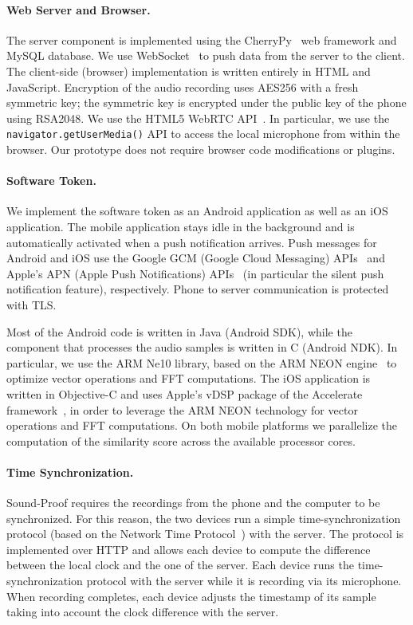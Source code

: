 \paragraph{Web Server and Browser.}
The server component is implemented using the CherryPy~\cite{cherrypy} web framework and MySQL database.
We use WebSocket~\cite{websocketsrfc} to push data from the server to the client.
The client-side (browser) implementation is written entirely in HTML and JavaScript.
Encryption of the audio recording uses AES256 with a fresh symmetric key; the symmetric key is encrypted under the public key of the phone using RSA2048.
We use the HTML5 WebRTC API~\cite{webrtcw3c,webrtc}.
In particular, we use the \texttt{navigator.getUserMedia()} API to access the local microphone from within the browser.
Our prototype does not require browser code modifications or plugins.

\paragraph{Software Token.}
We implement the software token as an Android application as well as an iOS application. The mobile application stays idle in the background and is automatically activated when a push notification arrives. Push messages for Android and iOS use the Google GCM (Google Cloud Messaging) APIs~\cite{gcm} and
Apple's APN (Apple Push Notifications) APIs~\cite{apn} (in particular the silent push notification feature), respectively. Phone to server communication is protected with TLS. %


Most of the Android code is written in Java (Android SDK), while the component that processes the audio samples is written in C (Android NDK).
In particular, we use the ARM Ne10 library, based on the ARM NEON engine~\cite{neon} to optimize vector operations and FFT computations.
The iOS application is written in Objective-C and uses Apple's vDSP package of the Accelerate framework~\cite{accelerate},
in order to leverage the ARM NEON technology for vector operations and FFT computations.
On both mobile platforms we parallelize the computation of the similarity score across the available processor cores.


\paragraph{Time Synchronization.}
Sound-Proof requires the recordings from the phone and the computer to be synchronized.
For this reason, the two devices run a simple time-synchronization protocol (based on the Network Time Protocol~\cite{ntpprotocol}) with the server.
The protocol is implemented over HTTP and allows each device to compute the difference between the local clock and the one of the server.
Each device runs the time-synchronization protocol with the server while it is recording via its microphone.
When recording completes, each device adjusts the timestamp of its sample taking into account the clock difference with the server.


